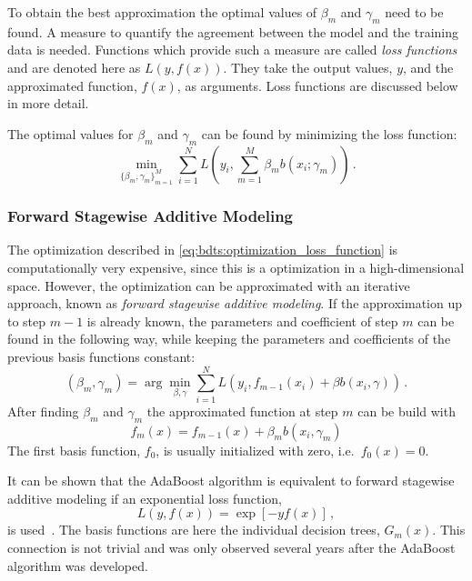 To obtain the best approximation the optimal values of $\beta_m$ and $\gamma_m$ need to be found.
A measure to quantify the agreement between the model and the training data is needed.
Functions which provide such a measure are called \emph{loss functions} and are denoted here as $L(y, f(x))$.
They take the output values, $y$, and the approximated function, $f(x)$, as arguments.
Loss functions are discussed below in more detail.

The optimal values for $\beta_m$ and $\gamma_m$ can be found by minimizing the loss function:
\begin{equation}
    \label{eq:bdts:optimization_loss_function}
    \min_{{\{\beta_m, \gamma_m\}}_{m=1}^M} \sum_{i=1}^{N} L \left( y_i, \sum_{m=1}^{M} \beta_m b(x_i; \gamma_m) \right) \,.
\end{equation}

\subsubsection{Forward Stagewise Additive Modeling}\label{subsub:bdt:boosting:forward_modeling}

The optimization described in \cref{eq:bdts:optimization_loss_function} is computationally very expensive, since
this is a optimization in a high-dimensional space.
However, the optimization can be approximated with an iterative approach, known as \emph{forward stagewise additive modeling}.
If the approximation up to step $m-1$ is already known, the parameters and coefficient of step $m$ can be found
in the following way, while keeping the parameters and coefficients of the previous basis functions constant:
\begin{equation}
    (\beta_m, \gamma_m) = \arg \min_{\beta, \gamma} \sum_{i=1}^N L(y_i, f_{m-1}(x_i) + \beta b(x_i, \gamma)) \,.
\end{equation}
After finding $\beta_m$ and $\gamma_m$ the approximated function at step $m$ can be build with
\begin{equation}
    f_m(x) = f_{m-1}(x) + \beta_m b(x_i, \gamma_m)
\end{equation}
The first basis function, $f_0$, is usually initialized with zero, i.e.\ $f_0(x) = 0$.

It can be shown that the AdaBoost algorithm is equivalent to forward stagewise additive modeling if an exponential
loss function,
\begin{equation}
    L(y, f(x)) = \exp \left[ - y f(x) \right] \,,
\end{equation}
is used~\cite{Hastie2009}.
The basis functions are here the individual decision trees, $G_m(x)$.
This connection is not trivial and was only observed several years after the AdaBoost algorithm was
developed.

